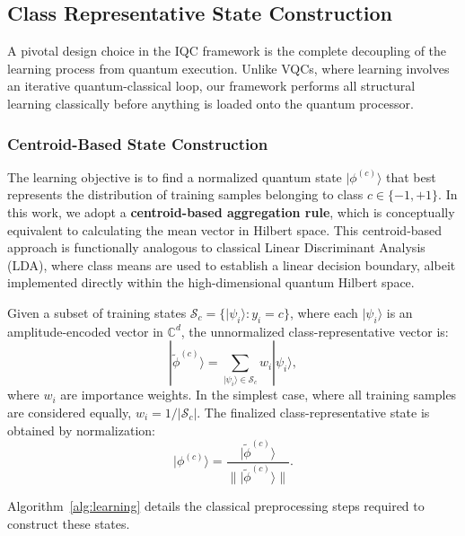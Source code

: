 \documentclass[conference]{IEEEtran}
\begin{document}
\subsection{Class Representative State Construction}
\label{sec:centroids}
A pivotal design choice in the IQC framework is the complete decoupling of the learning process from quantum execution. Unlike VQCs, where learning involves an iterative quantum-classical loop, our framework performs all structural learning classically before anything is loaded onto the quantum processor.

\subsubsection{Centroid-Based State Construction}
The learning objective is to find a normalized quantum state $|\phi^{(c)}\rangle$ that best represents the distribution of training samples belonging to class $c \in \{-1, +1\}$. In this work, we adopt a \textbf{centroid-based aggregation rule}, which is conceptually equivalent to calculating the mean vector in Hilbert space. This centroid-based approach is functionally analogous to classical Linear Discriminant Analysis (LDA), where class means are used to establish a linear decision boundary, albeit implemented directly within the high-dimensional quantum Hilbert space.

Given a subset of training states $\mathcal{S}_c = \{|\psi_i\rangle : y_i = c\}$, where each $|\psi_i\rangle$ is an amplitude-encoded vector in $\mathbb{C}^d$, the unnormalized class-representative vector is:
\begin{equation}
| \tilde{\phi}^{(c)} \rangle = \sum_{|\psi_i\rangle \in \mathcal{S}_c} w_i |\psi_i\rangle,
\end{equation}
where $w_i$ are importance weights. In the simplest case, where all training samples are considered equally, $w_i = 1/|\mathcal{S}_c|$. The finalized class-representative state is obtained by normalization:
\begin{equation}
|\phi^{(c)}\rangle = \frac{| \tilde{\phi}^{(c)} \rangle}{\| | \tilde{\phi}^{(c)} \rangle \|}.
\end{equation}

Algorithm~\ref{alg:learning} details the classical preprocessing steps required to construct these states.
\end{document}
